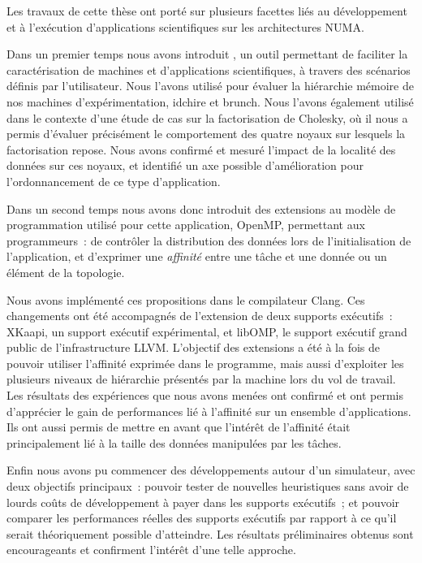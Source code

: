 Les travaux de cette thèse ont porté sur plusieurs facettes liés au développement et à l'exécution d'applications scientifiques sur les architectures NUMA.

Dans un premier temps nous avons introduit \outil, un outil permettant de faciliter la caractérisation de machines et d'applications scientifiques, à travers des scénarios définis par l'utilisateur.
Nous l'avons utilisé pour évaluer la hiérarchie mémoire de nos machines d'expérimentation, idchire et brunch.
Nous l'avons également utilisé dans le contexte d'une étude de cas sur la factorisation de Cholesky, où il nous a permis d'évaluer précisément le comportement des quatre noyaux sur lesquels la factorisation repose.
Nous avons confirmé et mesuré l'impact de la localité des données sur ces noyaux, et identifié un axe possible d'amélioration pour l'ordonnancement de ce type d'application.

Dans un second temps nous avons donc introduit des extensions au modèle de programmation utilisé pour cette application, OpenMP, permettant aux programmeurs~: de contrôler la distribution des données lors de l'initialisation de l'application, et d'exprimer une \emph{affinité} entre une tâche et une donnée ou un élément de la topologie.

Nous avons implémenté ces propositions dans le compilateur Clang.
Ces changements ont été accompagnés de l'extension de deux supports exécutifs~: XKaapi, un support exécutif expérimental, et libOMP, le support exécutif grand public de l'infrastructure LLVM.
L'objectif des extensions a été à la fois de pouvoir utiliser l'affinité exprimée dans le programme, mais aussi d'exploiter les plusieurs niveaux de hiérarchie présentés par la machine lors du vol de travail.
Les résultats des expériences que nous avons menées ont confirmé et ont permis d'apprécier le gain de performances lié à l'affinité sur un ensemble d'applications.
Ils ont aussi permis de mettre en avant que l'intérêt de l'affinité était principalement lié à la taille des données manipulées par les tâches.

Enfin nous avons pu commencer des développements autour d'un simulateur, avec deux objectifs principaux~: pouvoir tester de nouvelles heuristiques sans avoir de lourds coûts de développement à payer dans les supports exécutifs~; et pouvoir comparer les performances réelles des supports exécutifs par rapport à ce qu'il serait théoriquement possible d'atteindre.
Les résultats préliminaires obtenus sont encourageants et confirment l'intérêt d'une telle approche.



